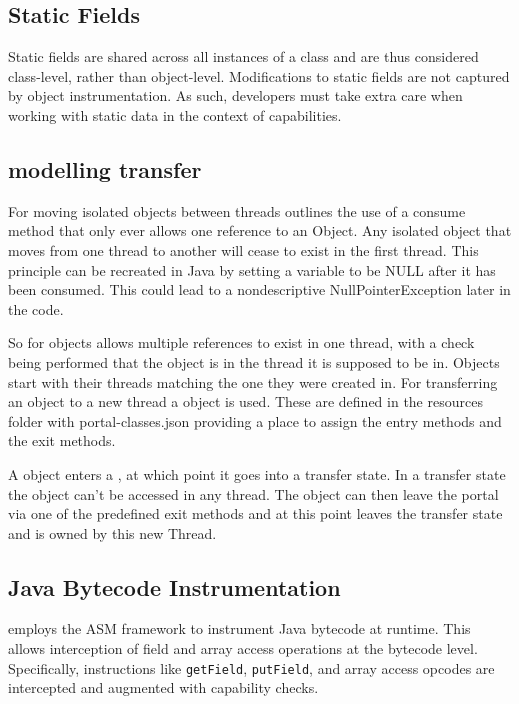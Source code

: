 \documentclass[JDala.tex]{subfiles}
\begin{document}
\subsection{Static Fields}
Static fields are shared across all instances of a class and are thus considered class-level, rather than object-level. Modifications to static fields are not captured by \jdala object instrumentation. As such, developers must take extra care when working with static data in the context of \dala capabilities.

\subsection{modelling transfer}
For moving isolated objects between threads \dala outlines the use of a consume method that only ever allows one reference to an Object. Any isolated object that moves from one thread to another will cease to exist in the first thread. This principle can be recreated in Java by setting a variable to be NULL after it has been consumed. This could lead to a nondescriptive NullPointerException later in the code.

So for \Isolated objects \jdala allows multiple references to exist in one thread, with a check being performed that the object is in the thread it is supposed to be in. Objects start with their threads matching the one they were created in. For transferring an \Isolated object to a new thread a \portal object is used. These are defined in the resources folder with portal-classes.json providing a place to assign the entry methods and the exit methods.

A \Isolated object enters a \portal, at which point it goes into a transfer state. In a transfer state the object can't be accessed in any thread. The object can then leave the portal via one of the predefined exit methods and at this point leaves the transfer state and is owned by this new Thread.


\subsection{Java Bytecode Instrumentation}
\jdala employs the ASM framework to instrument Java bytecode at runtime. This allows interception of field and array access operations at the bytecode level. Specifically, instructions like \texttt{getField}, \texttt{putField}, and array access opcodes are intercepted and augmented with capability checks.
\end{document}

